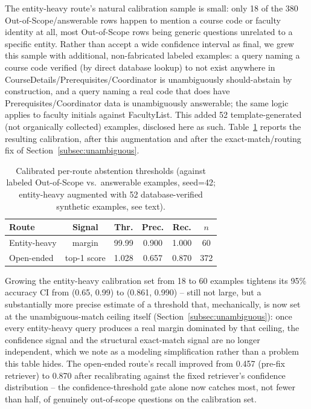 \documentclass[a4paper,twoside]{article}
\begin{document}
The entity-heavy route's natural calibration sample is small: only 18 of the 380 Out-of-Scope/answerable rows happen to mention a course code or faculty identity at all, most Out-of-Scope rows being generic questions unrelated to a specific entity. Rather than accept a wide confidence interval as final, we grew this sample with additional, non-fabricated labeled examples: a query naming a course code verified (by direct database lookup) to not exist anywhere in CourseDetails/Prerequisites/Coordinator is unambiguously should-abstain by construction, and a query naming a real code that does have Prerequisites/Coordinator data is unambiguously answerable; the same logic applies to faculty initials against FacultyList. This added 52 template-generated (not organically collected) examples, disclosed here as such. Table~\ref{tab:abstention-calib} reports the resulting calibration, after this augmentation and after the exact-match/routing fix of Section~\ref{subsec:unambiguous}.

\begin{table}[t]
\caption{Calibrated per-route abstention thresholds (against labeled Out-of-Scope vs.\ answerable examples, seed=42; entity-heavy augmented with 52 database-verified synthetic examples, see text).}\label{tab:abstention-calib} \centering
\begin{tabular}{|l|c|c|c|c|c|}
\hline
Route & Signal & Thr. & Prec. & Rec. & $n$ \\
\hline
Entity-heavy & margin & 99.99 & 0.900 & 1.000 & 60 \\
Open-ended & top-1 score & 1.028 & 0.657 & 0.870 & 372 \\
\hline
\end{tabular}
\end{table}

Growing the entity-heavy calibration set from 18 to 60 examples tightens its 95\% accuracy CI from (0.65, 0.99) to (0.861, 0.990) -- still not large, but a substantially more precise estimate of a threshold that, mechanically, is now set at the unambiguous-match ceiling itself (Section~\ref{subsec:unambiguous}): once every entity-heavy query produces a real margin dominated by that ceiling, the confidence signal and the structural exact-match signal are no longer independent, which we note as a modeling simplification rather than a problem this table hides. The open-ended route's recall improved from 0.457 (pre-fix retriever) to 0.870 after recalibrating against the fixed retriever's confidence distribution -- the confidence-threshold gate alone now catches most, not fewer than half, of genuinely out-of-scope questions on the calibration set.
\end{document}
